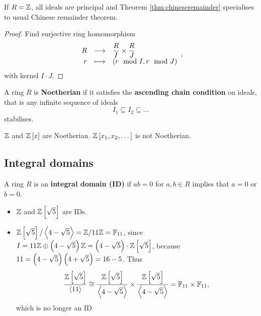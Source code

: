 \begin{remark*}
If $ R = \mathbb{Z} $, all ideals are principal and Theorem \ref{thm:chineseremainder} specialises to usual Chinese remainder theorem.
\end{remark*}

\begin{proof}
Find surjective ring homomorphism
$$ \function{R}{\dfrac{R}{I} \times \dfrac{R}{J}}{r}{\br{r \mod I, r \mod J}}, $$
with kernel $ I \cdot J $.
\end{proof}

\begin{definition}
A ring $ R $ is \textbf{Noetherian} if it satisfies the \textbf{ascending chain condition} on ideals, that is any infinite sequence of ideals
$$ I_1 \subseteq I_2 \subseteq \dots $$
stabilises.
\end{definition}

\begin{example*}
$ \mathbb{Z} $ and $ \Z\sbr{x} $ are Noetherian. $ \Z\sbr{x_1, x_2, \dots} $ is not Noetherian.
\end{example*}

\pagebreak

\subsection{Integral domains}


\begin{definition}
A ring $ R $ is an \textbf{integral domain (ID)} if $ ab = 0 $ for $ a, b \in R $ implies that $ a = 0 $ or $ b = 0 $.
\end{definition}

\begin{example*}
\hfill
\begin{itemize}
\item $ \mathbb{Z} $ and $ \Z\sbr{\sqrt{5}} $ are IDs.
\item $ \Z\sbr{\sqrt{5}} / \abr{4 - \sqrt{5}} = \Z / 11\Z = \F_{11} $, since $ I = 11\Z \oplus \br{4 - \sqrt{5}}\Z = \br{4 - \sqrt{5}} \cdot \Z\sbr{\sqrt{5}} $, because $ 11 = \br{4 - \sqrt{5}}\br{4 + \sqrt{5}} = 16 - 5 $. Thus
$$ \dfrac{\Z\sbr{\sqrt{5}}}{\abr{11}} \cong \dfrac{\Z\sbr{\sqrt{5}}}{\abr{4 - \sqrt{5}}} \times \dfrac{\Z\sbr{\sqrt{5}}}{\abr{4 - \sqrt{5}}} = \F_{11} \times \F_{11}, $$
which is no longer an ID.
\end{itemize}
\end{example*}

